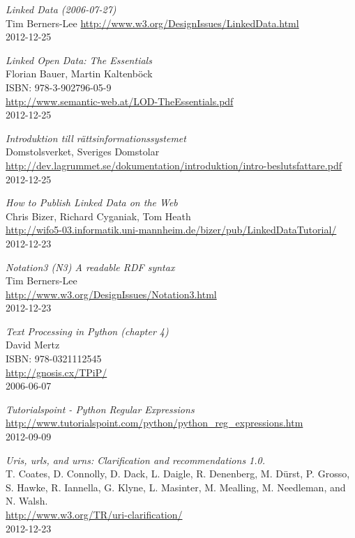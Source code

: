 \begin{thebibliography}{9}
\emph{Linked Data (2006-07-27)}\\
Tim Berners-Lee
\url{http://www.w3.org/DesignIssues/LinkedData.html}\\ 
2012-12-25

\emph{Linked Open Data: The Essentials}\\
Florian Bauer, Martin Kaltenböck\\
ISBN: 978-3-902796-05-9\\
\url{http://www.semantic-web.at/LOD-TheEssentials.pdf}\\ 
2012-12-25

\emph{Introduktion till rättsinformationssystemet}\\
Domstolsverket, Sveriges Domstolar\\
\url{http://dev.lagrummet.se/dokumentation/introduktion/intro-beslutsfattare.pdf}\\ 
2012-12-25

\emph{How to Publish Linked Data on the Web}\\
Chris Bizer, Richard Cyganiak, Tom Heath\\
\url{http://wifo5-03.informatik.uni-mannheim.de/bizer/pub/LinkedDataTutorial/}\\
2012-12-23

\emph{Notation3 (N3) A readable RDF syntax}\\
Tim Berners-Lee\\
\url{http://www.w3.org/DesignIssues/Notation3.html}\\
2012-12-23

\emph{Text Processing in Python (chapter 4)}\\
David Mertz\\
ISBN: 978-0321112545\\
\url{http://gnosis.cx/TPiP/}\\ 
2006-06-07

\emph{Tutorialspoint - Python Regular Expressions}\\
\url{http://www.tutorialspoint.com/python/python_reg_expressions.htm}\\ 
2012-09-09

\emph{Uris, urls, and urns: Clarification and recommendations 1.0.}\\
T. Coates, D. Connolly, D. Dack, L. Daigle, R. Denenberg, M. Dürst, P. Grosso,
S. Hawke, R. Iannella, G. Klyne, L. Masinter, M. Mealling, M. Needleman,
and N. Walsh.\\
\url{http://www.w3.org/TR/uri-clarification/}\\ 
2012-12-23

\end{thebibliography}

